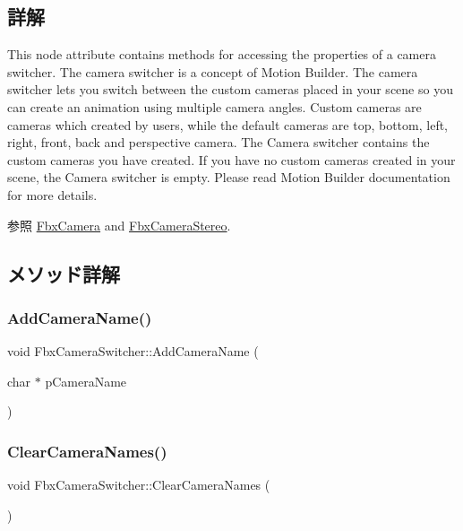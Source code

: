 \subsection{詳解}
This node attribute contains methods for accessing the properties of a camera switcher. The camera switcher is a concept of Motion Builder. The camera switcher lets you switch between the custom cameras placed in your scene so you can create an animation using multiple camera angles. Custom cameras are cameras which created by users, while the default cameras are top, bottom, left, right, front, back and perspective camera. The Camera switcher contains the custom cameras you have created. If you have no custom cameras created in your scene, the Camera switcher is empty. Please read Motion Builder documentation for more details.

\begin{DoxySeeAlso}{参照}
\hyperlink{class_fbx_camera}{Fbx\+Camera} and \hyperlink{class_fbx_camera_stereo}{Fbx\+Camera\+Stereo}. 
\end{DoxySeeAlso}


\subsection{メソッド詳解}
\mbox{\label{class_fbx_camera_switcher_a0b10a6c548f79eb7b3917807429ac8bb}} 
\subsubsection{\texorpdfstring{Add\+Camera\+Name()}{AddCameraName()}}
{\footnotesize\ttfamily void Fbx\+Camera\+Switcher\+::\+Add\+Camera\+Name (\begin{DoxyParamCaption}\item[{char $\ast$}]{p\+Camera\+Name }\end{DoxyParamCaption})}

\mbox{\label{class_fbx_camera_switcher_a19e4199ca22422dd83db62938c7f7b55}} 
\subsubsection{\texorpdfstring{Clear\+Camera\+Names()}{ClearCameraNames()}}
{\footnotesize\ttfamily void Fbx\+Camera\+Switcher\+::\+Clear\+Camera\+Names (\begin{DoxyParamCaption}{ }\end{DoxyParamCaption})}

